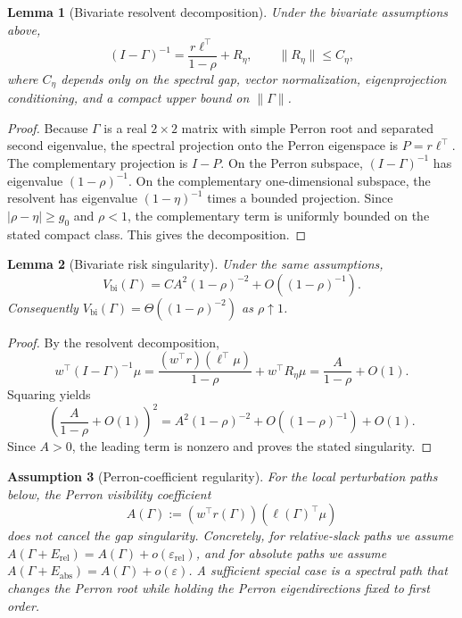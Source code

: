 \documentclass[11pt]{article}
\newtheorem{assumption}{Assumption}
\newtheorem{lemma}[assumption]{Lemma}
\newcommand{\eps}{\varepsilon}
\begin{document}
\begin{lemma}[Bivariate resolvent decomposition]
Under the bivariate assumptions above,
\[
(I-\Gamma)^{-1}
 =
\frac{r\ell^\top}{1-\rho}
+R_\eta,
\qquad
\|R_\eta\|\le C_\eta,
\]
where $C_\eta$ depends only on the spectral gap, vector normalization,
eigenprojection conditioning, and a compact upper bound on $\|\Gamma\|$.
\end{lemma}

\begin{proof}
Because $\Gamma$ is a real $2\times2$ matrix with simple Perron root and
separated second eigenvalue, the spectral projection onto the Perron eigenspace
is $P=r\ell^\top$. The complementary projection is $I-P$. On the Perron
subspace, $(I-\Gamma)^{-1}$ has eigenvalue $(1-\rho)^{-1}$. On the complementary
one-dimensional subspace, the resolvent has eigenvalue $(1-\eta)^{-1}$ times a
bounded projection. Since $|\rho-\eta|\ge g_0$ and $\rho<1$, the complementary
term is uniformly bounded on the stated compact class. This gives the
decomposition.
\end{proof}

\begin{lemma}[Bivariate risk singularity]
Under the same assumptions,
\[
V_{\mathrm{bi}}(\Gamma)
 =
C A^2(1-\rho)^{-2}
 +O((1-\rho)^{-1}).
\]
Consequently $V_{\mathrm{bi}}(\Gamma)=\Theta((1-\rho)^{-2})$ as
$\rho\uparrow1$.
\end{lemma}

\begin{proof}
By the resolvent decomposition,
\[
w^\top(I-\Gamma)^{-1}\mu
=
\frac{(w^\top r)(\ell^\top\mu)}{1-\rho}
+ w^\top R_\eta \mu
=
\frac{A}{1-\rho}+O(1).
\]
Squaring yields
\[
\left(\frac{A}{1-\rho}+O(1)\right)^2
=
A^2(1-\rho)^{-2}+O((1-\rho)^{-1})+O(1).
\]
Since $A>0$, the leading term is nonzero and proves the stated singularity.
\end{proof}

\begin{assumption}[Perron-coefficient regularity]
For the local perturbation paths below, the Perron visibility coefficient
\[
A(\Gamma):=(w^\top r(\Gamma))(\ell(\Gamma)^\top\mu)
\]
does not cancel the gap singularity. Concretely, for relative-slack paths we
assume $A(\Gamma+E_{\mathrm{rel}})=A(\Gamma)+o(\eps_{\mathrm{rel}})$, and for
absolute paths we assume $A(\Gamma+E_{\mathrm{abs}})=A(\Gamma)+o(\eps)$. A
sufficient special case is a spectral path that changes the Perron root while
holding the Perron eigendirections fixed to first order.
\end{assumption}
\end{document}
